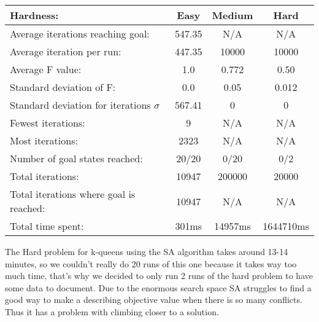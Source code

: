 \documentclass[12pt, a4paper]{article}
\begin{document}
\begin{center}
  \begin{tabular}{| l | c c c|}
    \hline
    Hardness: &\textbf{Easy} & \textbf{Medium} & \textbf{Hard} \\ \hline
    Average iterations reaching goal: & 547.35& N/A & N/A\\
    Average iteration per run:  & 447.35 & 10000 & 10000\\
    Average F value: & 1.0 & 0.772 & 0.50\\
    Standard deviation of F: & 0.0 & 0.05 & 0.012\\
    Standard deviation for iterations $\sigma$ & 567.41 & 0 & 0\\
    Fewest iterations: & 9 & N/A & N/A\\ 
    Most iterations: & 2323 & N/A& N/A\\ 
    Number of goal states reached: & 20/20 & 0/20 & 0/2\\
    Total iterations: & 10947 & 200000 & 20000\\
    Total iterations where goal is reached: & 10947 & N/A& N/A\\
    Total time spent: & 301ms & 14957ms & 1644710ms\\
    \hline
  \end{tabular}
\end{center}
The Hard problem for k-queens using the SA algorithm takes around 13-14 minutes, so we couldn't really do 20 runs of this one because it takes way too much time, that's why we decided to only run 2 runs of the hard problem to have some data to document. Due to the enormous search space SA struggles to find a good way to make a describing objective value when there is so many conflicts. Thus it has a problem with climbing closer to a solution. 
\end{document}
